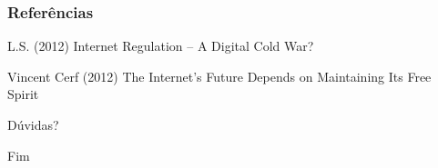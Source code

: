 \documentclass{beamer}
\begin{document}

\begin{frame}
\frametitle{Referências}
\footnotesize{
\begin{thebibliography}{99} %

 L.S. (2012)
\newblock Internet Regulation -- A Digital Cold War?

 Vincent Cerf (2012)
\newblock The Internet's Future Depends on Maintaining Its Free Spirit

\end{thebibliography}
}
\end{frame}


\begin{frame}
\Huge{\centerline{Dúvidas?}}
\end{frame}


\begin{frame}
\Huge{\centerline{Fim}}
\end{frame}

\end{document}
